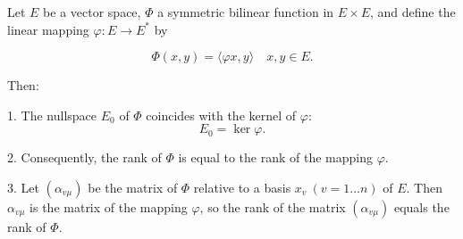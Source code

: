 Let $E$ be a vector space, $\Phi$ a symmetric bilinear function in $E \times E$, and define the linear mapping $\varphi: E \rightarrow E^*$ by

$$\Phi(x, y) = \langle \varphi x, y \rangle \quad x, y \in E.$$

Then:

1. The nullspace $E_0$ of $\Phi$ coincides with the kernel of $\varphi$:
   $$E_0 = \ker \varphi.$$

2. Consequently, the rank of $\Phi$ is equal to the rank of the mapping $\varphi$.

3. Let $(\alpha_{v\mu})$ be the matrix of $\Phi$ relative to a basis $x_v\ (v = 1 \dots n)$ of $E$. Then $\alpha_{v\mu}$ is the matrix of the mapping $\varphi$, so the rank of the matrix $(\alpha_{v\mu})$ equals the rank of $\Phi$.

